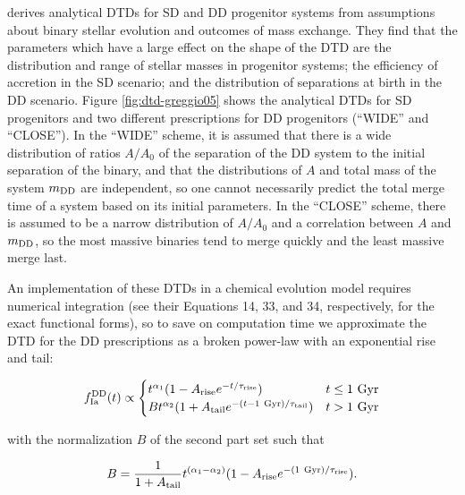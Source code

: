 \documentclass[twocolumn,linenumbers,twocolappendix]{aastex631}
\begin{document}
\citet{Greggio2005-AnalyticalRates} derives analytical DTDs for SD and DD progenitor systems from assumptions about binary stellar evolution and outcomes of mass exchange. They find that the parameters which have a large effect on the shape of the DTD are the distribution and range of stellar masses in progenitor systems; the efficiency of accretion in the SD scenario; and the distribution of separations at birth in the DD scenario. Figure \ref{fig:dtd-greggio05} shows the analytical DTDs for SD progenitors and two different prescriptions for DD progenitors (``WIDE'' and ``CLOSE''). In the ``WIDE'' scheme, it is assumed that there is a wide distribution of ratios $A/A_0$ of the separation of the DD system to the initial separation of the binary, and that the distributions of $A$ and total mass of the system $m_{\rm{DD}}$ are independent, so one cannot necessarily predict the total merge time of a system based on its initial parameters. In the ``CLOSE'' scheme, there is assumed to be a narrow distribution of $A/A_0$ and a correlation between $A$ and $m_{\rm{DD}}$, so the most massive binaries tend to merge quickly and the least massive merge last.

An implementation of these DTDs in a chemical evolution model requires numerical integration (see their Equations 14, 33, and 34, respectively, for the exact functional forms), so to save on computation time we approximate the DTD for the DD prescriptions as a broken power-law with an exponential rise and tail:

\begin{equation}
    f_{\rm{Ia}}^{\rm{DD}}(t) \propto
    \begin{cases}
        t^{\alpha_1} (1 - A_{\rm{rise}} e^{-t/\tau_{\rm{rise}}}) & t \le 1~\rm{Gyr} \\
        B t^{\alpha_2} (1 + A_{\rm{tail}} e^{-(t - 1~\rm{Gyr})/\tau_{\rm{tail}}}) & t > 1~\rm{Gyr}
    \end{cases}
    \label{eq:greggio05-approx}
\end{equation}

\noindent with the normalization $B$ of the second part set such that

\begin{equation}
    B = \frac{1}{1 + A_{\rm{tail}}} t^{(\alpha_1-\alpha_2)} (1 - A_{\rm{rise}} e^{-(1~\rm{Gyr})/\tau_{\rm{rise}}}).
\end{equation}
\end{document}
